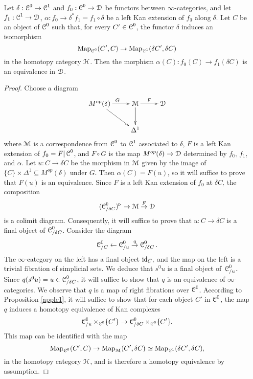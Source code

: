 \begin{proposition}\label{timeless}
Let $\delta: \operatorname{\mathcal{C}}^{0} \rightarrow \operatorname{\mathcal{C}}^{1}$ and $f_0: \operatorname{\mathcal{C}}^{0} \rightarrow \operatorname{\mathcal{D}}$ be functors between $\infty$-categories, and let $f_{1}: \operatorname{\mathcal{C}}^{1} \rightarrow \operatorname{\mathcal{D}}$, $\alpha: f_{0} \rightarrow \delta^{\ast} f_1 = f_1 \circ \delta$ be a left Kan extension of $f_0$ along $\delta$.
Let $C$ be an object of $\operatorname{\mathcal{C}}^{0}$ such that, for every $C' \in \operatorname{\mathcal{C}}^{0}$, the functor
$\delta$ induces an isomorphism
$$ \operatorname{{Map}}_{\operatorname{\mathcal{C}}^{0}}(C',C) \rightarrow \operatorname{{Map}}_{\operatorname{\mathcal{C}}^{1}}( \delta C', \delta C)$$
in the homotopy category $\operatorname{\mathcal{H}}$. Then the morphism
$\alpha(C): f_0(C) \rightarrow f_1(\delta C)$ is an equivalence in $\operatorname{\mathcal{D}}$.
\end{proposition}

\begin{proof}
Choose a diagram
$$ \xymatrix{ M^{op}(\delta) \ar[r]^{G} \ar[dr] & \calM \ar[d] \ar[r]^{F} & \calD \\
& \Delta^1 & }$$
where $\operatorname{\mathcal{M}}$ is a correspondence from $\operatorname{\mathcal{C}}^{0}$ to $\operatorname{\mathcal{C}}^{1}$ associated to $\delta$, $F$ is a left Kan extension of $f_0 = F| \operatorname{\mathcal{C}}^{0}$, and $F \circ G$ is the map
$M^{op}(\delta) \rightarrow \operatorname{\mathcal{D}}$ determined by $f_0$, $f_1$, and $\alpha$.
Let $u: C \rightarrow \delta C$ be the morphism in $\operatorname{\mathcal{M}}$ given by the image
of $\{C\} \times \Delta^1 \subseteq M^{op}(\delta)$ under $G$. Then
$\alpha(C) = F(u)$, so it will suffice to prove that $F(u)$ is an equivalence. Since
$F$ is a left Kan extension of $f_0$ at $\delta C$, the composition
$$ (\operatorname{\mathcal{C}}^{0}_{/\delta C})^{\triangleright} \rightarrow
\operatorname{\mathcal{M}} \stackrel{F}{\rightarrow} \operatorname{\mathcal{D}}$$
is a colimit diagram. Consequently, it will suffice to prove that
$u: C \rightarrow \delta C$ is a final object of
$\operatorname{\mathcal{C}}^{0}_{/ \delta C}$. Consider the diagram
$$ \operatorname{\mathcal{C}}^{0}_{/C} \leftarrow \operatorname{\mathcal{C}}^{0}_{/u} \stackrel{q}{\rightarrow} \operatorname{\mathcal{C}}^{0}_{/\delta C}.$$
The $\infty$-category on the left has a final object $\operatorname{id}_{C}$, and the map on the left
is a trivial fibration of simplicial sets. We deduce that $s^0 u$ is a final object of\
$\operatorname{\mathcal{C}}^{0}_{/u}$. Since $q( s^0 u) = u \in \operatorname{\mathcal{C}}^{0}_{/\delta C}$, it will suffice to show that
$q$ is an equivalence of $\infty$-categories. We observe that $q$ is a map of right fibrations over $\operatorname{\mathcal{C}}^{0}$. According to Proposition \ref{apple1}, it will suffice to show that for each object $C'$ in $\operatorname{\mathcal{C}}^{0}$, the map $q$ induces a homotopy equivalence of Kan complexes
$$ \operatorname{\mathcal{C}}^{0}_{/u} \times_{ \operatorname{\mathcal{C}}^{0}} \{C'\} \rightarrow \operatorname{\mathcal{C}}^{0}_{/ \delta C} \times_{\operatorname{\mathcal{C}}^{0}} \{C'\}.$$
This map can be identified with the map
$$ \operatorname{{Map}}_{\operatorname{\mathcal{C}}^0}( C',C) \rightarrow \operatorname{{Map}}_{\operatorname{\mathcal{M}}}(C', \delta C)
\simeq \operatorname{{Map}}_{\operatorname{\mathcal{C}}^1}(\delta C', \delta C),$$
in the homotopy category $\operatorname{\mathcal{H}}$, and is therefore a homotopy equivalence by assumption.
\end{proof}

